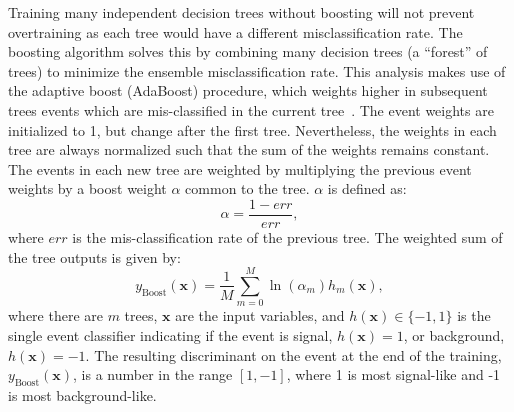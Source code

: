 Training many independent decision trees without boosting will not prevent overtraining as each tree would have a different misclassification rate.
The boosting algorithm solves this by combining many decision trees (a ``forest'' of trees) to minimize the ensemble misclassification rate.
This analysis makes use of the adaptive boost (AdaBoost) procedure, which weights higher in subsequent trees events which are mis-classified in the current tree~\cite{FREUND1997119}.
The event weights are initialized to 1, but change after the first tree.
Nevertheless, the weights in each tree are always normalized such that the sum of the weights remains constant.
The events in each new tree are weighted by multiplying the previous event weights by a boost weight $\alpha$ common to the tree.
$\alpha$ is defined as:
\begin{equation}
  \alpha=\frac{1-err}{err},
\end{equation}
where $err$ is the mis-classification rate of the previous tree.
The weighted sum of the tree outputs is given by:
\begin{equation}
  y_{\text{Boost}}\left(\textbf{x}\right)=\frac{1}{M}\sum_{m=0}^{M}\ln\left(\alpha_{m}\right)h_{m}\left(\textbf{x}\right),
\end{equation}
where there are $m$ trees, $\textbf{x}$ are the input variables, and $h\left(\textbf{x}\right)\in\{-1,1\}$ is the single event classifier indicating if the event is signal, $h\left(\textbf{x}\right)=1$, or background, $h\left(\textbf{x}\right)=-1$.
The resulting discriminant on the event at the end of the training, $y_{\text{Boost}}\left(\textbf{x}\right)$, is a number in the range $[1,-1]$, where 1 is most signal-like and -1 is most background-like.

